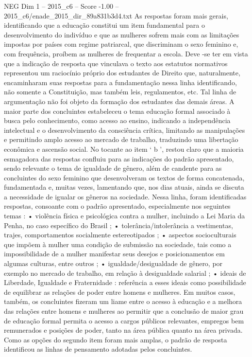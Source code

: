 \begin{textsample}{NEG Dim 1 – 2015\_c6 – Score -1.00 – 2015\_c6/enade\_2015\_dir\_89a831b3d4.txt}
As respostas foram mais gerais, identificando que a educação constitui um item fundamental para o desenvolvimento do indivíduo e que as mulheres sofrem mais com as limitações impostas por países com regime patriarcal, que discriminam o sexo feminino e, com frequência, proíbem as mulheres de frequentar a escola.
Deve -se ter em vista que a indicação de resposta que vinculava o texto aos estatutos normativos representou um raciocínio próprio dos estudantes de Direito que, naturalmente, encaminharam suas respostas para a fundamentação nessa linha identificando, não somente a Constituição, mas também leis, regulamentos, etc.
Tal linha de argumentação não foi objeto da formação dos estudantes das demais áreas.
A maior parte dos concluintes estabeleceu o tema educação formal associado à busca pelo conhecimento, como acesso ao ensino, indicando a independência intelectual e o desenvolvimento da consciência crítica, limitando as manipulações e permitindo amplo acesso ao mercado de trabalho, traduzindo uma libertação econômica e ascensão social.
No tocante ao item ‘ b ’, restou claro que a maioria esmagadora das respostas confluiu para as indicações do padrão apresentado, sendo relevante o tema de igualdade de gênero, além de candente para as concluintes do sexo feminino que desenvolveram os textos de forma concatenada, fundamentada e, muitas vezes, lamentando que, nos dias atuais, ainda se discuta a necessidade de igualar os gêneros na sociedade.
Nessa linha, foram identificadas respostas, consoante com o padrão apresentado, especialmente nos seguintes temas : • violência física e psicológica contra a mulher, incluindo a Lei Maria da Penha, no caso específico do Brasil ; • tolerância/intolerância a vestimentas, trajes, comportamentos socialmente estereotipados ; • aspectos socioculturais que impõem à mulher uma condição de submissão na sociedade, tais como a impossibilidade de a mulher manifestar seus desejos e posicionamentos em algumas culturas, entre outros ; • igualdade/desigualdade de gênero, por exemplo no mercado de trabalho, em relação à desigualdade salarial ; • ideais de Liberdade, Igualdade e Fraternidade : referência a esses ideais como possibilidade de equilibrar as relações de poder entre homens e mulheres.
Em muitos casos, também, os concluintes fizeram um liame entre o acesso à educação e a melhora das relações entre homens e mulheres ao permitir que a conclusão de maior grau de educação formal permita o acesso a cargos públicos relevantes, empregos bem remunerados e posições de poder, tanto na área pública quanto na área privada.
Como as opções do segundo item foram mais amplas, o padrão de resposta identificou as linhas de pensamento adotadas pelos concluintes.

\end{textsample}
